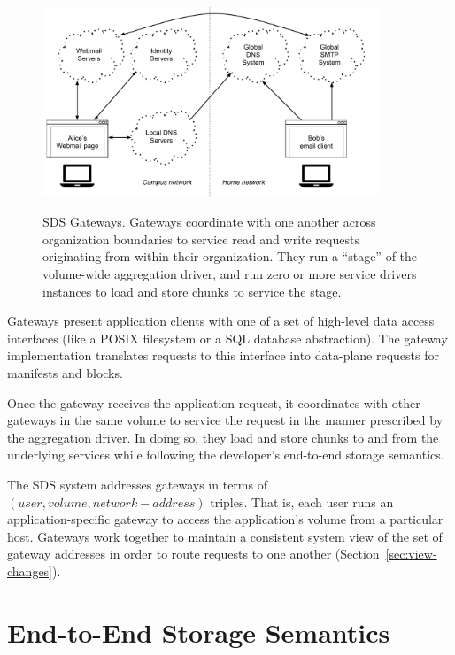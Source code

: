 \begin{figure}[h]
   \caption{SDS Gateways.  Gateways coordinate with one another across
   organization boundaries to service read and write requests originating from
   within their organization.  They run a ``stage'' of the volume-wide aggregation driver,
   and run zero or more service drivers instances to load and store chunks to
   service the stage.}
   \centering
   \includegraphics[width=0.9\textwidth,page=6]{figures/dissertation-figures}
   \label{fig:chap2-gateways}
\end{figure}

Gateways present application clients with one of a set of high-level data access
interfaces (like a POSIX filesystem or a SQL database abstraction).
The gateway implementation translates requests to this interface
into data-plane requests for manifests and blocks.

Once the gateway receives the application request, it coordinates with other
gateways in the same volume to service the request in the manner prescribed by
the aggregation driver.  In doing so, they load and store chunks to and from the
underlying services while following the developer's end-to-end storage
semantics.

The SDS system addresses gateways in terms of $(user, volume, network-address)$
triples.  That is, each user runs an application-specific gateway to access the
application's volume from a particular host.  Gateways work together to maintain
a consistent system view of the set of gateway addresses in order to route
requests to one another (Section~\ref{sec:view-changes}).

\section{End-to-End Storage Semantics}
\label{sec:aggregation-driver-model}

